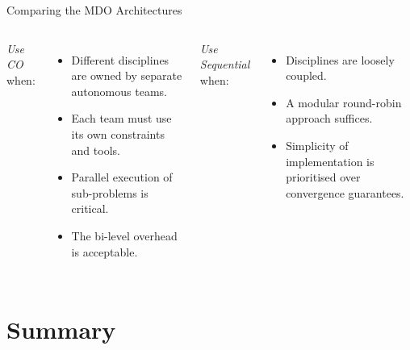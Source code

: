 \documentclass[aspectratio=169,10pt]{beamer}
\begin{document}
\begin{frame}[allowframebreaks]{Comparing the MDO Architectures}
\begin{columns}[T]
    \medskip
    \textit{Use CO} when:
    \begin{itemize}
      \item Different disciplines are owned by separate autonomous teams.
      \item Each team must use its own constraints and tools.
      \item Parallel execution of sub-problems is critical.
      \item The bi-level overhead is acceptable.
    \end{itemize}

    \medskip
    \textit{Use Sequential} when:
    \begin{itemize}
      \item Disciplines are loosely coupled.
      \item A modular round-robin approach suffices.
      \item Simplicity of implementation is prioritised over convergence guarantees.
    \end{itemize}
  \end{columns}

\end{frame}

\section{Summary}
\end{document}
